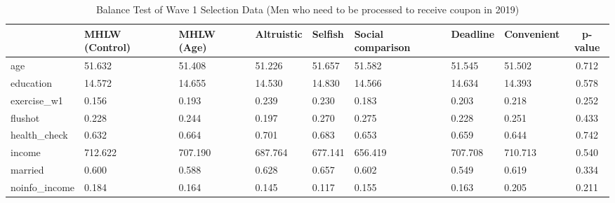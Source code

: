 \begin{table}[!h]

\caption{Balance Test of Wave 1 Selection Data (Men who need to be processed to receive coupon in 2019) \label{tab:int-coupon0-balance}}
\centering
\begin{tabular}[t]{l>{\centering\arraybackslash}p{3em}>{\centering\arraybackslash}p{3em}>{\centering\arraybackslash}p{3em}>{\centering\arraybackslash}p{3em}>{\centering\arraybackslash}p{3em}>{\centering\arraybackslash}p{3em}>{\centering\arraybackslash}p{3em}c}
\toprule
  & MHLW (Control) & MHLW (Age) & Altruistic & Selfish & Social comparison & Deadline & Convenient & p-value\\
\midrule
age & \num{51.632} & \num{51.408} & \num{51.226} & \num{51.657} & \num{51.582} & \num{51.545} & \num{51.502} & \num{0.712}\\
education & \num{14.572} & \num{14.655} & \num{14.530} & \num{14.830} & \num{14.566} & \num{14.634} & \num{14.393} & \num{0.578}\\
exercise\_w1 & \num{0.156} & \num{0.193} & \num{0.239} & \num{0.230} & \num{0.183} & \num{0.203} & \num{0.218} & \num{0.252}\\
flushot & \num{0.228} & \num{0.244} & \num{0.197} & \num{0.270} & \num{0.275} & \num{0.228} & \num{0.251} & \num{0.433}\\
health\_check & \num{0.632} & \num{0.664} & \num{0.701} & \num{0.683} & \num{0.653} & \num{0.659} & \num{0.644} & \num{0.742}\\
income & \num{712.622} & \num{707.190} & \num{687.764} & \num{677.141} & \num{656.419} & \num{707.708} & \num{710.713} & \num{0.540}\\
married & \num{0.600} & \num{0.588} & \num{0.628} & \num{0.657} & \num{0.602} & \num{0.549} & \num{0.619} & \num{0.334}\\
noinfo\_income & \num{0.184} & \num{0.164} & \num{0.145} & \num{0.117} & \num{0.155} & \num{0.163} & \num{0.205} & \num{0.211}\\
\bottomrule
\end{tabular}
\end{table}
